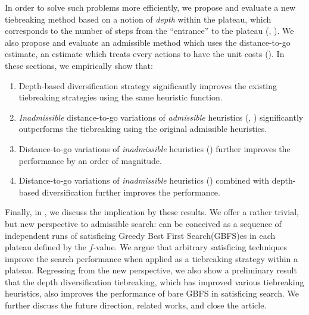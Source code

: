 In order to solve such problems more efficiently, we propose and
evaluate a new
tiebreaking method based on a notion of \emph{depth} within the plateau,
which corresponds to the number of steps from the ``entrance'' to
the plateau (,
). We also propose and evaluate an
admissible method which uses the distance-to-go estimate, an estimate which treats every actions
to have the unit costs ().
In these sections, we empirically show that:
\begin{enumerate}
 \item Depth-based diversification strategy significantly improves the
       existing tiebreaking strategies using the same heuristic function.
 \item \emph{Inadmissible} distance-to-go variations of \emph{admissible} heuristics
       (\lmcut, \mands)
       significantly outperforms the tiebreaking using the original admissible heuristics.
 \item Distance-to-go variations of \emph{inadmissible} heuristics
       (\ff) further improves the performance by an order of magnitude.
 \item Distance-to-go variations of \emph{inadmissible} heuristics
       (\ff) combined with depth-based diversification further
       improves the performance.
\end{enumerate}

Finally, in , we discuss the implication by these
results. We offer a rather trivial, but new perspective to admissible
\astar search: \astar can be conceived as a sequence of independent runs
of satisficing Greedy Best First Search(GBFS)es in each plateau defined by the
$f$-value. We argue that arbitrary satisficing techniques improve the
search performance when applied as a tiebreaking strategy within
a plateau.
% 
Regressing from the new perspective, we also show a preliminary result
that the depth diversification tiebreaking, which has improved various
tiebreaking heuristics, also improves the performance of bare GBFS in
satisficing search.
We further discuss the future direction, related works, and close the article.


